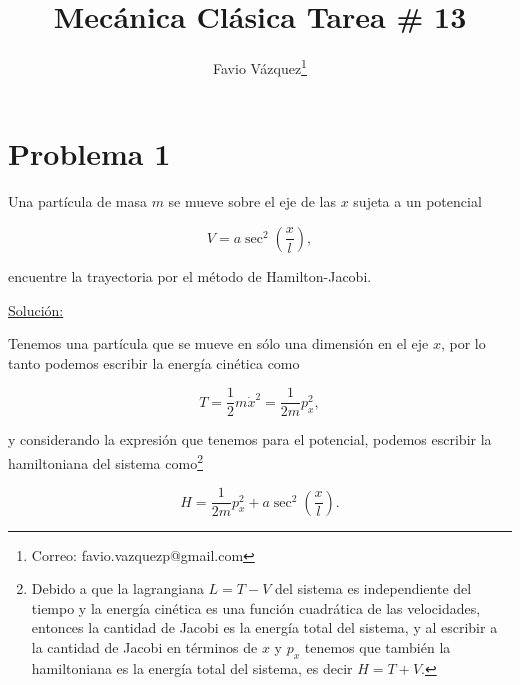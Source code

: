 \documentclass[a4paper,10pt]{article}
\title{Mecánica Clásica Tarea \# 13}
\author{Favio Vázquez\thanks{Correo: favio.vazquezp@gmail.com}}\affil{Instituto de Ciencias Nucleares. Universidad Nacional Autónoma de México.}
\date{}
\numberwithin{equation}{section}
\begin{document}
\makeatletter
\def\@maketitle{%
  \newpage
  \null
  \vskip 2em%
  \begin{center}%
  \let \footnote \thanks
    {\Large\bfseries \@title \par}%
    \vskip 1.5em%
    {\normalsize
      \lineskip .5em%
      \begin{tabular}[t]{c}%
        \@author
      \end{tabular}\par}%
    \vskip 1em%
    {\normalsize \@date}%
  \end{center}%
  \par
  \vskip 1.5em}
\makeatother

\maketitle

\section{Problema 1}

Una partícula de masa $m$ se mueve sobre el eje de las $x$ sujeta a un potencial 

$$
V = a\sec^2{\left(\frac{x}{l}\right)},
$$

encuentre la trayectoria por el método de Hamilton-Jacobi.

\vspace{.3cm}

\underline{Solución:} \vspace{.3cm}

Tenemos una partícula que se mueve en sólo una dimensión en el eje $x$, por lo tanto 
podemos escribir la energía cinética como

\begin{equation}
 T = \frac{1}{2}m\dot{x}^2 = \frac{1}{2m}p_x^2,
\end{equation}

y considerando la expresión que tenemos para el potencial, podemos escribir la 
hamiltoniana del sistema como\footnote{Debido a que la lagrangiana $L = T - V$ del 
sistema es independiente del tiempo y la energía cinética es una función cuadrática 
de las velocidades, entonces la cantidad de Jacobi es la energía total del sistema, 
y al escribir a la cantidad de Jacobi en términos de $x$ y $p_x$ tenemos que también 
la hamiltoniana es la energía total del sistema, es decir $H = T+V$.}

\begin{equation}
 H = \frac{1}{2m}p_x^2 + a\sec^2{\left(\frac{x}{l}\right)}.
\end{equation}
\end{document}
